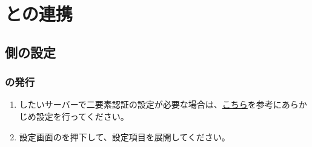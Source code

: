\section{\mi との連携}
\label{sec:misskey1}
    \subsection{\mi 側の設定}
    \label{sec:misskey2}
        \subsubsection{\accessToken の発行}
        \label{sec:misskey3}
            \begin{enumerate}
                \item \nowplaying したい\mi サーバーで二要素認証の設定が必要な場合は、\href{https://support.misskey.io/hc/ja/articles/9354169842191-%E4%BA%8C%E8%A6%81%E7%B4%A0%E8%AA%8D%E8%A8%BC%E3%81%AE%E8%A8%AD%E5%AE%9A%E3%81%AB%E3%81%A4%E3%81%84%E3%81%A6}{こちら}を参考にあらかじめ設定を行ってください。
                \label{item:misskey1}
                \item 設定画面のを押下して、設定項目を展開してください。
                \label{item:misskey2}
                    \begin{figure}[htbp]
                        \begin{minipage}[b]{0.45\linewidth}
                            \centering
\end{minipage}
\end{figure}
\end{enumerate}
